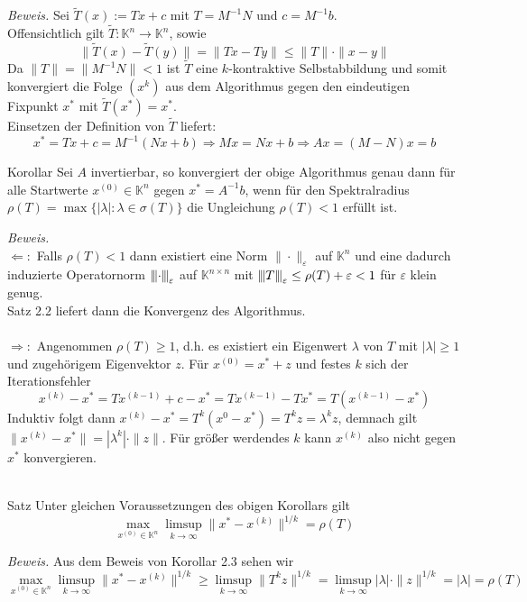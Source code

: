 \documentclass{article}
\begin{document}
\textit{Beweis.} Sei $\tilde{T}(x) := Tx + c$ mit $T=M^{-1}N$ und $c=M^{-1}b$.\\
Offensichtlich gilt $\tilde{T}:\mathbb{K}^n\rightarrow\mathbb{K}^n$, sowie 
\[\|\tilde{T}(x)-\tilde{T}(y)\| = \|Tx-Ty\|\leq \|T\|\cdot\|x-y\|\]
Da $\|T\|=\|M^{-1}N\|<1$ ist $\tilde{T}$ eine $k$-kontraktive Selbstabbildung und somit konvergiert 
die Folge $(x^k)$ aus dem Algorithmus gegen den eindeutigen Fixpunkt $x^*$ mit $\tilde{T}(x^*)=x^*$. \\ 
Einsetzen der Definition von $\tilde{T}$ liefert:
\[x^*=Tx+c=M^{-1}(Nx+b)\Rightarrow Mx=Nx+b \Rightarrow Ax=(M-N)x=b\]
\begin{thmbox}{Korollar}
    Sei $A$ invertierbar, so konvergiert der obige Algorithmus genau dann für alle Startwerte $x^{(0)}\in\mathbb{K}^n$ 
    gegen $x^*=A^{-1}b$, wenn für den Spektralradius $\rho(T)=\max\{|\lambda|:\lambda\in\sigma(T)\}$ 
    die Ungleichung $\rho(T)<1$ erfüllt ist.
\end{thmbox}
\textit{Beweis.} \\
$\Leftarrow:$ Falls $\rho(T)<1$ dann existiert eine Norm $\|\cdot\|_\varepsilon$ auf $\mathbb{K}^n$ 
und eine dadurch induzierte Operatornorm ${\left\vert\kern-0.25ex\left\vert\kern-0.25ex\left\vert \cdot \right\vert\kern-0.25ex\right\vert\kern-0.25ex\right\vert}_\varepsilon$ auf $\mathbb{K}^{n\times n}$ 
mit ${\left\vert\kern-0.25ex\left\vert\kern-0.25ex\left\vert T \right\vert\kern-0.25ex\right\vert\kern-0.25ex\right\vert}_\varepsilon \leq \rho(T) + \varepsilon < 1$ für $\varepsilon$ klein genug. \\
Satz 2.2 liefert dann die Konvergenz des Algorithmus. \\ \\
$\Rightarrow:$ Angenommen $\rho(T)\geq 1$, d.h. es existiert ein Eigenwert $\lambda$ von $T$ 
mit $|\lambda|\geq 1$ und zugehörigem Eigenvektor $z$. Für $x^{(0)}=x^*+z$ und festes $k$ sich der Iterationsfehler
\[x^{(k)}-x^* = Tx^{(k-1)}+c-x^* = Tx^{(k-1)}-Tx^* = T(x^{(k-1)}-x^*)\]
Induktiv folgt dann $x^{(k)}-x^* = T^k(x^{0}-x^*)=T^kz=\lambda^kz$, demnach gilt 
$\|x^{(k)}-x^*\|=|\lambda^k|\cdot\|z\|$.
Für größer werdendes $k$ kann $x^{(k)}$ also nicht gegen $x^*$ konvergieren. \\ \\
\begin{thmbox}{Satz}
    Unter gleichen Voraussetzungen des obigen Korollars gilt 
    \[\max_{x^{(0)}\in\mathbb{K}^n} \limsup_{k\rightarrow \infty} \|x^*-x^{(k)}\|^{1/k}=\rho(T)\]
\end{thmbox}
\textit{Beweis.}
Aus dem Beweis von Korollar 2.3 sehen wir
\[\max_{x^{(0)}\in\mathbb{K}^n} \limsup_{k\rightarrow \infty} \|x^*-x^{(k)}\|^{1/k}
\geq\limsup_{k\rightarrow\infty} \|T^kz\|^{1/k}=\limsup_{k\rightarrow\infty}|\lambda|\cdot\|z\|^{1/k}
=|\lambda|=\rho(T)\]
\end{document}
